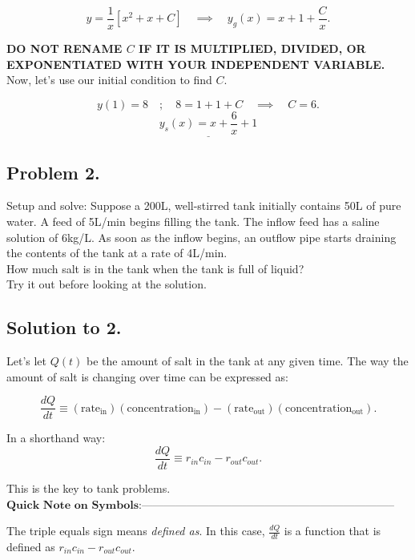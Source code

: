 \documentclass[a4paper,12pt]{article} %
\begin{document}
$$ y = \frac{1}{x}[x^2 + x + C] \quad\implies\quad y_g(x) = x + 1 + \frac{C}{x}.$$

\textbf{DO NOT RENAME $C$ IF IT IS MULTIPLIED, DIVIDED, OR EXPONENTIATED WITH YOUR INDEPENDENT VARIABLE.} Now, let's use our initial condition to find $C$.

$$ y(1)=8 \quad;\quad 8 = 1 + 1 + C \quad\implies\quad C = 6. $$
$$ \underline{\boxed{y_s(x) = x + \frac{6}{x} + 1}} $$

\pagebreak

\subsection*{Problem 2.} 

Setup and solve: Suppose a 200L, well-stirred tank initially contains 50L of pure water. A feed of 5L/min begins filling the tank. The inflow feed has a saline solution of 6kg/L. As soon as the inflow begins, an outflow pipe starts draining the contents of the tank at a rate of 4L/min.\\

How much salt is in the tank when the tank is full of liquid?\\

Try it out before looking at the solution.

\pagebreak

\subsection*{Solution to 2.}

Let's let $Q(t)$ be the amount of salt in the tank at any given time. The way the amount of salt is changing over time can be expressed as:

$$ \frac{dQ}{dt} \equiv (\text{rate}_{\text{in}})(\text{concentration}_{\text{in}}) - (\text{rate}_{\text{out}})(\text{concentration}_{\text{out}}). $$

In a shorthand way:
\begin{equation}
	 \frac{dQ}{dt} \equiv r_{in}c_{in} - r_{out}c_{out}. \label{key_to_tank}
\end{equation}

This is the key to tank problems.\\

$\boxed{\textbf{Quick Note on Symbols:}}$--------------------------------------------------------------------

The triple equals sign means \textit{defined as}. In this case, $\frac{dQ}{dt}$ is a function that is defined as $r_{in}c_{in} - r_{out}c_{out}$.\\
\end{document}

